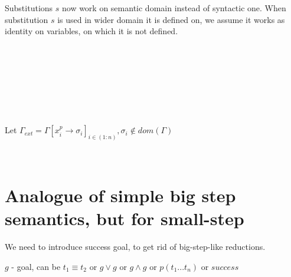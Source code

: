 \documentclass{article}
\begin{document}
Substitutions $ s $ now work on semantic domain instead of syntactic one. When substitution $ s $ is used in wider domain it is defined on, we assume it works as identity on variables, on which it is not defined.

\ 


\ 


\ 

\ 

Let $ \Gamma_{ext} = \Gamma[x^p_i \rightarrow \sigma_i]_{i \in (1:n)}, \sigma_i \notin dom(\Gamma) $

\ 



\section{Analogue of simple big step semantics, but for small-step}

We need to introduce success goal, to get rid of big-step-like reductions.

$ g $ - goal, can be $ t_1 \equiv t_2 $ or $ g \vee g $ or $ g \wedge g $ or $ p(t_1 ... t_n) $ or $ success $

\ 


\ 


\ 



\ 


\ 


\ 


\ 

\end{document}
